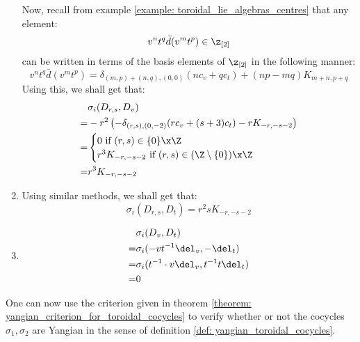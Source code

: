 \begin{example}
\begin{enumerate}
$$                    $$
                Now, recall from example \ref{example: toroidal_lie_algebras_centres} that any element:
                    $$v^n t^q \bar{d}(v^m t^p) \in \z_{[2]}$$
                can be written in terms of the basis elements of $\z_{[2]}$ in the following manner:
                    $$v^n t^q \bar{d}(v^m t^p) = \delta_{(m, p) + (n, q), (0, 0)} ( n c_v + q c_t ) + (np - mq) K_{m + n, p + q}$$
                Using this, we shall get that:
                    $$
                        \begin{aligned}
                            & \sigma_i(D_{r, s}, D_v)
                            \\
                            = & -r^2 \left( -\delta_{(r, s), (0, -2)} ( r c_v + (s + 3) c_t ) - r K_{-r, -s - 2} \right)
                            \\
                            = &
                            \begin{cases}
                                \text{$0$ if $(r, s) \in \{0\} \x \Z$}
                                \\
                                \text{$r^3 K_{-r, -s - 2}$ if $(r, s) \in (\Z \setminus \{0\}) \x \Z$}
                            \end{cases}
                            \\
                            = & r^3 K_{-r, -s - 2}
                        \end{aligned}
                    $$
                \item Using similar methods, we shall get that:
                    $$\sigma_i(D_{r, s}, D_t) = r^2s K_{-r, -s - 2}$$
                \item
                    $$
                        \begin{aligned}
                            & \sigma_i(D_v, D_t)
                            \\
                            = & \sigma_i(-v t^{-1} \del_v, -\del_t)
                            \\
                            = & \sigma_i(t^{-1} \cdot v \del_v, t^{-1} t \del_t)
                            \\
                            = & 0
                        \end{aligned}
                    $$
            \end{enumerate}
            One can now use the criterion given in theorem \ref{theorem: yangian_criterion_for_toroidal_cocycles} to verify whether or not the cocycles $\sigma_1, \sigma_2$ are Yangian in the sense of definition \ref{def: yangian_toroidal_cocycles}.
        \end{example}
